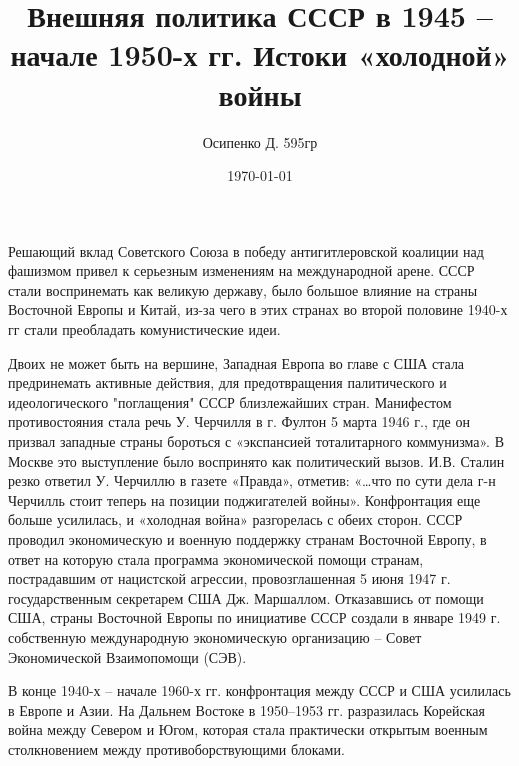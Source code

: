 \documentclass[a4paper, 12pt]{article}
\title{Внешняя политика СССР в 1945 – начале 1950-х гг. Истоки «холодной» войны}
\author{Осипенко Д. 595гр}
\date{\today}
\begin{document}
\sffamily
\maketitle
Решающий вклад Советского Союза в победу антигитлеровской коалиции над фашизмом привел к серьезным изменениям на международной арене. СССР стали воспринемать как великую державу, было большое влияние на страны Восточной Европы и Китай, из-за чего в этих странах во второй половине 1940-х гг стали преобладать комунистические идеи.

 Двоих не может быть на вершине, Западная Европа во главе с США стала предринемать активные действия, для предотвращения палитического и идеологического "поглащения" СССР близлежайших стран. Манифестом противостояния стала речь У. Черчилля в г. Фултон 5 марта 1946 г., где он призвал западные страны бороться с «экспансией тоталитарного коммунизма». В Москве это выступление было воспринято как политический вызов. И.В. Сталин резко ответил У. Черчиллю в газете «Правда», отметив: «…что по сути дела г-н Черчилль стоит теперь на позиции поджигателей войны». Конфронтация еще больше усилилась, и «холодная война» разгорелась с обеих сторон. СССР проводил экономическую и военную поддержку странам Восточной Европу, в ответ на которую стала программа экономической помощи странам, пострадавшим от нацистской агрессии, провозглашенная 5 июня 1947 г. государственным секретарем США Дж. Маршаллом. Отказавшись от помощи США, страны Восточной Европы по инициативе СССР создали в январе 1949 г. собственную международную экономическую организацию – Совет Экономической Взаимопомощи (СЭВ).

В конце 1940-х – начале 1960-х гг. конфронтация между СССР и США усилилась в Европе и Азии. На Дальнем Востоке в 1950–1953 гг. разразилась Корейская война между Севером и Югом, которая стала практически открытым военным столкновением между противоборствующими блоками.
\end{document}
